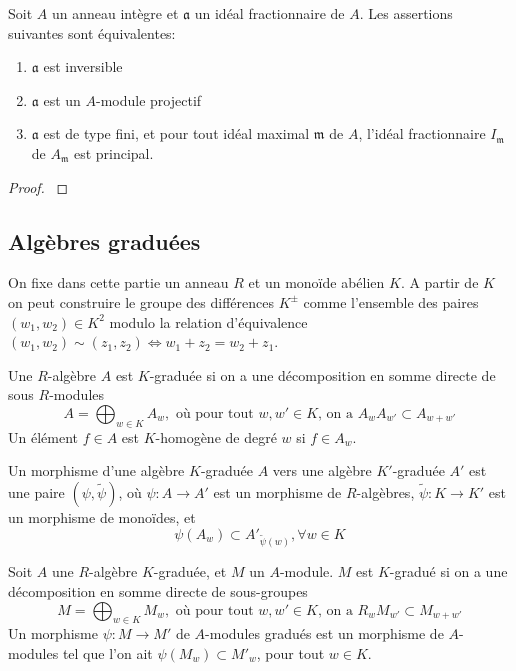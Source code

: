 \begin{thm}\label{ideauxinversibles}
Soit $A$ un anneau intègre et $\mathfrak{a}$ un idéal fractionnaire de $A$. Les assertions suivantes sont équivalentes:
\begin{enumerate}
\item $\mathfrak{a}$ est inversible
\item $\mathfrak{a}$ est un $A$-module projectif
\item $\mathfrak{a}$ est de type fini, et pour tout idéal maximal $\mathfrak{m}$ de $A$, l'idéal fractionnaire $I_\mathfrak{m}$ de $A_\mathfrak{m}$ est principal.
\end{enumerate}
\end{thm}
\begin{proof}
\cite[11.3]{Matsumura}
\end{proof}

\subsection{Algèbres graduées}

On fixe dans cette partie un anneau $R$ et un monoïde abélien $K$. A partir de $K$ on peut construire le groupe des différences $K^{\pm}$ comme l'ensemble des paires $(w_1,w_2)\in K^2$ modulo la relation d'équivalence $(w_1,w_2)\sim (z_1,z_2)\iff w_1+z_2=w_2+z_1$. 

\begin{defn}
Une $R$-algèbre $A$ est $K$-graduée si on a une décomposition en somme directe de sous $R$-modules 
$$A=\bigoplus_{w\in K}A_w,\text{ où pour tout } w,w'\in K\text{, on a }A_wA_{w'}\subset A_{w+w'}$$
Un élément $f\in A$ est $K$-homogène de degré $w$ si $f\in A_w$.

Un morphisme d'une algèbre $K$-graduée $A$ vers une algèbre $K'$-graduée $A'$ est une paire $(\psi,\widetilde{\psi})$, où $\psi:A\rightarrow A'$ est un morphisme de $R$-algèbres, $\widetilde{\psi}:K\rightarrow K'$ est un morphisme de monoïdes, et
$$\psi(A_w)\subset A'_{\widetilde{\psi}(w)}, \forall w\in K$$  
\end{defn}

\begin{defn}
Soit $A$ une $R$-algèbre $K$-graduée, et $M$ un $A$-module. $M$ est $K$-gradué si on a une décomposition en somme directe de sous-groupes
$$M=\bigoplus_{w\in K}M_w,\text{ où pour tout } w,w'\in K\text{, on a }R_wM_{w'}\subset M_{w+w'}$$
Un morphisme $\psi:M\rightarrow M'$ de $A$-modules gradués est un morphisme de $A$-modules tel que l'on ait $\psi(M_w)\subset M'_w$, pour tout $w\in K$.
\end{defn}

